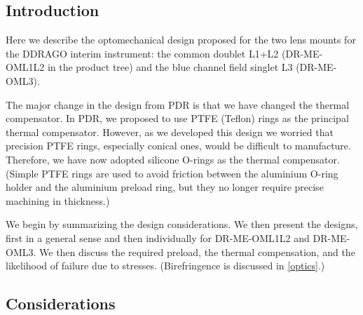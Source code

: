 \documentclass{article}
\begin{document}

\subsection{Introduction}

Here we describe the optomechanical design proposed for the two lens mounts for the DDRAGO interim instrument: the common doublet L1+L2 (DR-ME-OML1L2 in the product tree) and the blue channel field singlet L3 (DR-ME-OML3).

The major change in the design from PDR is that we have changed the thermal compensator. In PDR, we proposed to use PTFE (Teflon) rings as the principal thermal compensator. However, as we developed this design we worried that precision PTFE rings, especially conical ones, would be difficult to manufacture. Therefore, we have now adopted silicone O-rings as the thermal compensator. (Simple PTFE rings are used to avoid friction between the aluminium O-ring holder and the aluminium preload ring, but they no longer require precise machining in thickness.)


We begin by summarizing the design considerations. We then present the designs, first in a general sense and then individually for DR-ME-OML1L2 and DR-ME-OML3. We then discuss the required preload, the thermal compensation, and the likelihood of failure due to stresses. (Birefringence is discussed in \ref{optics}.)

\subsection{Considerations}
\end{document}
